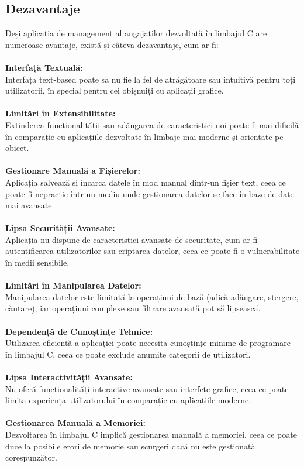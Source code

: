 \documentclass[12pt,a4paper]{article}
\begin{document}
\subsection{Dezavantaje}
Deși aplicația de management al angajaților dezvoltată în limbajul C are numeroase avantaje, există și câteva dezavantaje, cum ar fi:\\\\
\textbf{Interfață Textuală:\\}
Interfața text-based poate să nu fie la fel de atrăgătoare sau intuitivă pentru toți utilizatorii, în special pentru cei obișnuiți cu aplicații grafice.\\\\
\textbf{Limitări în Extensibilitate:\\}
Extinderea funcționalității sau adăugarea de caracteristici noi poate fi mai dificilă în comparație cu aplicațiile dezvoltate în limbaje mai moderne și orientate pe obiect.\\\\
\textbf{Gestionare Manuală a Fișierelor:\\}
Aplicația salvează și încarcă datele în mod manual dintr-un fișier text, ceea ce poate fi nepractic într-un mediu unde gestionarea datelor se face în baze de date mai avansate.\\\\
\textbf{Lipsa Securității Avansate:\\}
Aplicația nu dispune de caracteristici avansate de securitate, cum ar fi autentificarea utilizatorilor sau criptarea datelor, ceea ce poate fi o vulnerabilitate în medii sensibile.\\\\
\textbf{Limitări în Manipularea Datelor:\\}
Manipularea datelor este limitată la operațiuni de bază (adică adăugare, ștergere, căutare), iar operațiuni complexe sau filtrare avansată pot să lipsească.\\\\
\textbf{Dependență de Cunoștințe Tehnice:\\}
Utilizarea eficientă a aplicației poate necesita cunoștințe minime de programare în limbajul C, ceea ce poate exclude anumite categorii de utilizatori.\\\\
\textbf{Lipsa Interactivității Avansate:\\}
Nu oferă funcționalități interactive avansate sau interfețe grafice, ceea ce poate limita experiența utilizatorului în comparație cu aplicațiile moderne.\\\\
\textbf{Gestionarea Manuală a Memoriei:\\}
Dezvoltarea în limbajul C implică gestionarea manuală a memoriei, ceea ce poate duce la posibile erori de memorie sau scurgeri dacă nu este gestionată corespunzător.\\\\
\end{document}
